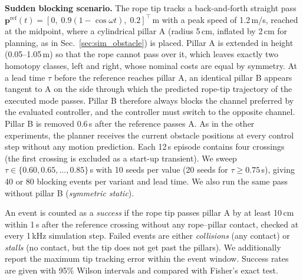 \textbf{Sudden blocking scenario.} The rope tip tracks a back-and-forth straight pass $\bm{p}^{\mathrm{ref}}(t)=[0,\;0.9(1-\cos\omega t),\;0.2]^\top$\,m with a peak speed of 1.2\,m/s, reached at the midpoint, where a cylindrical pillar A (radius 5\,cm, inflated by 2\,cm for planning, as in Sec.~\ref{sec:sim_obstacle}) is placed. Pillar A is extended in height (0.05--1.05\,m) so that the rope cannot pass over it, which leaves exactly two homotopy classes, left and right, whose nominal costs are equal by symmetry. At a lead time $\tau$ before the reference reaches pillar A, an identical pillar B appears tangent to A on the side through which the predicted rope-tip trajectory of the executed mode passes. Pillar B therefore always blocks the channel preferred by the evaluated controller, and the controller must switch to the opposite channel. Pillar B is removed 0.6\,s after the reference passes A. As in the other experiments, the planner receives the current obstacle positions at every control step without any motion prediction. Each 12\,s episode contains four crossings (the first crossing is excluded as a start-up transient). We sweep $\tau\in\{0.60,0.65,\dots,0.85\}$\,s with 10 seeds per value (20 seeds for $\tau\ge 0.75$\,s), giving 40 or 80 blocking events per variant and lead time. We also run the same pass without pillar B (\emph{symmetric static}).

An event is counted as a \emph{success} if the rope tip passes pillar A by at least 10\,cm within 1\,s after the reference crossing without any rope--pillar contact, checked at every 1\,kHz simulation step. Failed events are either \emph{collisions} (any contact) or \emph{stalls} (no contact, but the tip does not get past the pillars). We additionally report the maximum tip tracking error within the event window. Success rates are given with 95\% Wilson intervals and compared with Fisher's exact test.

